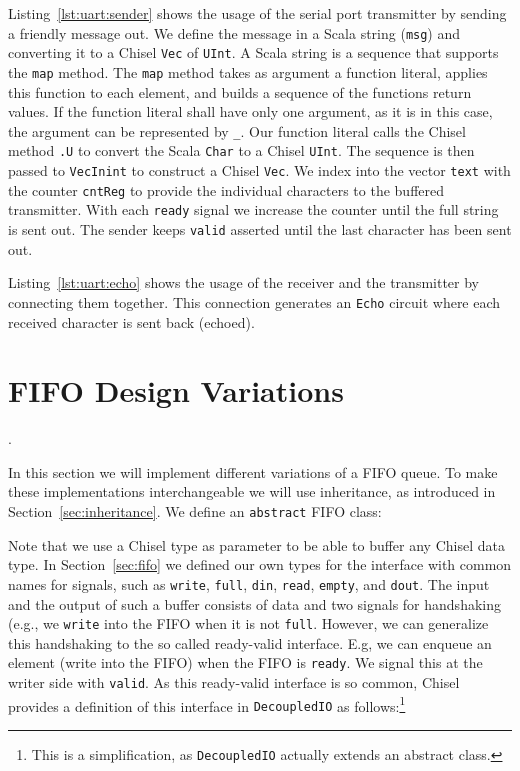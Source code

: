 \documentclass[%
    10pt,
    headinclude, footexclude,
    openright, %
    notitlepage,
    cleardoubleempty,
    headsepline,
    pointlessnumbers,
    bibtotoc, idxtotoc,
    ]{scrbook}
\newcommand{\code}[1]{{\small{\texttt{#1}}}}
\newcommand{\codefoot}[1]{{\footnotesize{\texttt{#1}}}}
\begin{document}
Listing~\ref{lst:uart:sender} shows the usage of the serial port transmitter
by sending a friendly message out. We define the message in a Scala
string (\code{msg}) and converting it to a Chisel \code{Vec} of \code{UInt}.
A Scala string is a sequence that supports the \code{map} method.
The \code{map} method takes as argument a function literal, applies this function to
each element, and builds a sequence of the functions return values.
If the function literal shall have only one argument, as it is in this case, the
argument can be represented by \code{\_}. Our function literal calls
the Chisel method \code{.U} to convert the Scala \code{Char} to a Chisel
\code{UInt}. The sequence is then passed to \code{VecInint} to construct
a Chisel \code{Vec}. We index into the vector \code{text} with the counter
\code{cntReg} to provide the individual characters to the buffered transmitter.
With each \code{ready} signal we increase the counter until the full string
is sent out. The sender keeps \code{valid} asserted until the last character
has been sent out.

Listing~\ref{lst:uart:echo} shows the usage of the receiver and the transmitter
by connecting them together. This connection generates an \code{Echo} circuit where each
received character is sent back (echoed).

\section{FIFO Design Variations}
\label{sec:more:fifo}.

In this section we will implement different variations of a FIFO queue.
To make these implementations interchangeable we will use inheritance,
as introduced in Section~\ref{sec:inheritance}. We define an \code{abstract}
FIFO class:



\noindent Note that we use a Chisel type as parameter to be able to buffer
any Chisel data type.
In Section~\ref{sec:fifo} we defined our own types for the interface with common
names for signals, such as \code{write}, \code{full}, \code{din}, \code{read},
\code{empty}, and \code{dout}. The input and the output of such a buffer consists
of data and two signals for handshaking (e.g., we \code{write} into the FIFO when
it is not \code{full}.
However, we can generalize this handshaking to the so called ready-valid interface.
E.g, we can enqueue an element (write into the FIFO) when the FIFO is \code{ready}.
We signal this at the writer side with \code{valid}.
As this ready-valid interface is so common, Chisel provides a definition
of this interface in \code{DecoupledIO} as follows:\footnote{This is a simplification,
as \codefoot{DecoupledIO} actually extends an abstract class.}
\end{document}
